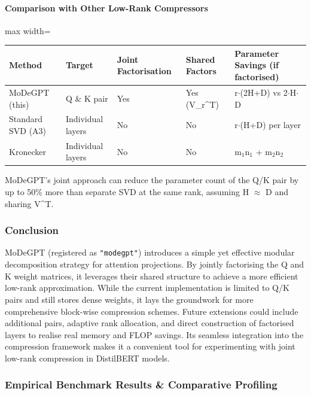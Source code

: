 \paragraph{Comparison with Other Low-Rank Compressors}

\begin{center}
\begin{adjustbox}{max width=\columnwidth}
\renewcommand{\arraystretch}{1.2}
\begin{tabular}{lllll}
\toprule
Method & Target & Joint Factorisation & Shared Factors & Parameter Savings (if factorised) \\
\midrule
MoDeGPT (this) & Q \& K pair & Yes & Yes (V\_r\textasciicircum{}T) & r$\cdot$(2H+D) vs 2$\cdot$H$\cdot$D \\
Standard SVD (A3) & Individual layers & No & No & r$\cdot$(H+D) per layer \\
Kronecker & Individual layers & No & No & m$_1$n$_1$ + m$_2$n$_2$ \\

\bottomrule
\end{tabular}
\end{adjustbox}
\end{center}
MoDeGPT's joint approach can reduce the parameter count of the Q/K pair by up to 50\% more than separate SVD at the same rank, assuming H $\approx$ D and sharing V\textasciicircum{}T.


\subsubsection*{Conclusion}

MoDeGPT (registered as \texttt{"modegpt"}) introduces a simple yet effective modular decomposition strategy for attention projections. By jointly factorising the Q and K weight matrices, it leverages their shared structure to achieve a more efficient low-rank approximation. While the current implementation is limited to Q/K pairs and still stores dense weights, it lays the groundwork for more comprehensive block-wise compression schemes. Future extensions could include additional pairs, adaptive rank allocation, and direct construction of factorised layers to realise real memory and FLOP savings. Its seamless integration into the compression framework makes it a convenient tool for experimenting with joint low-rank compression in DistilBERT models.

\subsubsection*{Empirical Benchmark Results \& Comparative Profiling}

